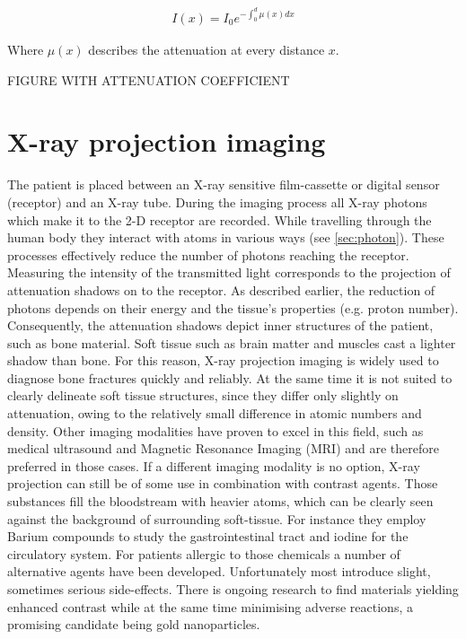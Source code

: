 \begin{align}
\label{eq:mu_int}
I(x) = I_0 e^{- \int_{0}^{d} \mu(x)dx}
\end{align}

Where $\mu(x)$ describes the attenuation at every distance $x$.

FIGURE WITH ATTENUATION COEFFICIENT



\section{X-ray projection imaging}
The patient is placed between an X-ray sensitive film-cassette or digital sensor (receptor) and an X-ray tube. During the imaging process all X-ray photons which make it to the 2-D receptor are recorded. While travelling through the human body they interact with atoms in various ways (see \ref{sec:photon}). These processes effectively reduce the number of photons reaching the receptor. Measuring the intensity of the transmitted light corresponds to the projection of attenuation shadows on to the receptor.
As described earlier, the reduction of photons depends on their energy and the tissue's properties (e.g. proton number).
Consequently, the attenuation shadows depict inner structures of the patient, such as bone material.
Soft tissue such as brain matter and muscles cast a lighter shadow than bone. For this reason, X-ray projection imaging is widely used to diagnose bone fractures quickly and reliably. At the same time it is not suited to clearly delineate soft tissue structures, since they differ only slightly on attenuation, owing to the relatively small difference in atomic numbers and density.
Other imaging modalities have proven to excel in this field, such as medical ultrasound and Magnetic Resonance Imaging (MRI) and are therefore preferred in those cases.
If a different imaging modality is no option, X-ray projection can still be of some use in combination with contrast agents. Those substances fill the bloodstream with heavier atoms, which can be clearly seen against the background of surrounding soft-tissue. For instance they employ Barium compounds to study the gastrointestinal tract and iodine for the circulatory system.
For patients allergic to those chemicals a number of alternative agents have been developed. Unfortunately most introduce slight, sometimes serious side-effects. There is ongoing research to find materials yielding enhanced contrast while at the same time minimising adverse reactions, a promising candidate being gold nanoparticles.

